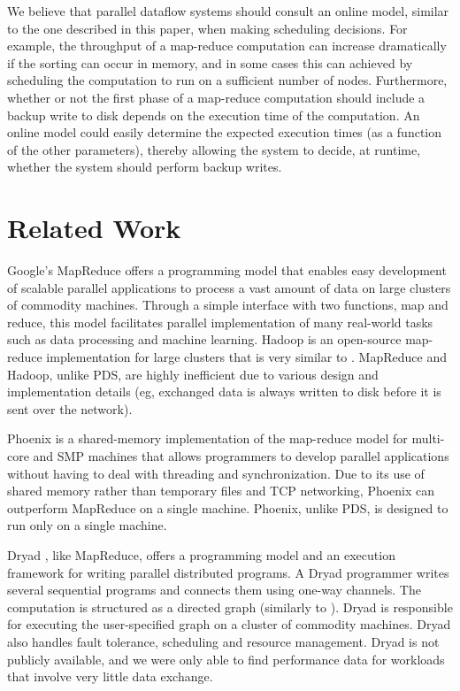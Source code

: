 \documentclass{acm_proc_article-sp}
\begin{document}
We believe that parallel dataflow systems should consult an online model, similar to the one described in this paper, when making scheduling decisions. For example, the throughput of a map-reduce computation can increase dramatically if the sorting can occur in memory, and in some cases this can achieved by scheduling the computation to run on a sufficient number of nodes. Furthermore, whether or not the first phase of a map-reduce computation should include a backup write to disk depends on the execution time of the computation. An online model could easily determine the expected execution times (as a function of the other parameters), thereby allowing the system to decide, at runtime, whether the system should perform backup writes.

\section{Related Work}
Google's MapReduce \cite{mapreduce} offers a programming model that enables easy development of scalable parallel applications to process a vast amount of data on large clusters of commodity machines. Through a simple interface with two functions, map and reduce, this model facilitates parallel implementation of many real-world tasks such as data processing and machine learning. Hadoop \cite{hadoop} is an open-source map-reduce implementation for large clusters that is very similar to \cite{mapreduce}. MapReduce and Hadoop, unlike PDS, are highly inefficient due to various design and implementation details (eg, exchanged data is always written to disk before it is sent over the network).

Phoenix \cite{phoenix} is a shared-memory implementation of the map-reduce model for multi-core and SMP machines that allows programmers to develop parallel applications without having to deal with threading and synchronization. Due to its use of shared memory rather than temporary files and TCP networking, Phoenix can  outperform MapReduce on a single machine. Phoenix, unlike PDS, is designed to run only on a single machine.

Dryad \cite{dryad}, like MapReduce, offers a programming model and an execution framework for writing parallel distributed programs. A Dryad programmer writes several sequential programs and connects them using one-way channels. The computation is structured as a directed graph (similarly to \cite{paralleldatabases}). Dryad is responsible for executing the user-specified graph on a cluster of commodity machines. Dryad also handles fault tolerance, scheduling and resource management. Dryad is not publicly available, and we were only able to find performance data for workloads that involve very little data exchange.
\end{document}
